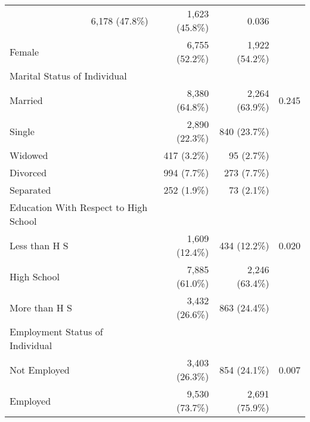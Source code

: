 \begin{tabular}{llll}
  \multicolumn{1}{r}{6,178 (47.8\%)} &
  \multicolumn{1}{r}{1,623 (45.8\%)} &
  \multicolumn{1}{r}{0.036} \\
\multicolumn{1}{l}{\hspace{1em}Female} &
  \multicolumn{1}{r}{6,755 (52.2\%)} &
  \multicolumn{1}{r}{1,922 (54.2\%)} &
  \multicolumn{1}{r}{} \\
\multicolumn{1}{l}{Marital Status of Individual} &
  \multicolumn{1}{r}{} &
  \multicolumn{1}{r}{} &
  \multicolumn{1}{r}{} \\
\multicolumn{1}{l}{\hspace{1em}Married} &
  \multicolumn{1}{r}{8,380 (64.8\%)} &
  \multicolumn{1}{r}{2,264 (63.9\%)} &
  \multicolumn{1}{r}{0.245} \\
\multicolumn{1}{l}{\hspace{1em}Single} &
  \multicolumn{1}{r}{2,890 (22.3\%)} &
  \multicolumn{1}{r}{840 (23.7\%)} &
  \multicolumn{1}{r}{} \\
\multicolumn{1}{l}{\hspace{1em}Widowed} &
  \multicolumn{1}{r}{417 (3.2\%)} &
  \multicolumn{1}{r}{95 (2.7\%)} &
  \multicolumn{1}{r}{} \\
\multicolumn{1}{l}{\hspace{1em}Divorced} &
  \multicolumn{1}{r}{994 (7.7\%)} &
  \multicolumn{1}{r}{273 (7.7\%)} &
  \multicolumn{1}{r}{} \\
\multicolumn{1}{l}{\hspace{1em}Separated} &
  \multicolumn{1}{r}{252 (1.9\%)} &
  \multicolumn{1}{r}{73 (2.1\%)} &
  \multicolumn{1}{r}{} \\
\multicolumn{1}{l}{Education With Respect to High School} &
  \multicolumn{1}{r}{} &
  \multicolumn{1}{r}{} &
  \multicolumn{1}{r}{} \\
\multicolumn{1}{l}{\hspace{1em}Less than H S} &
  \multicolumn{1}{r}{1,609 (12.4\%)} &
  \multicolumn{1}{r}{434 (12.2\%)} &
  \multicolumn{1}{r}{0.020} \\
\multicolumn{1}{l}{\hspace{1em}High School} &
  \multicolumn{1}{r}{7,885 (61.0\%)} &
  \multicolumn{1}{r}{2,246 (63.4\%)} &
  \multicolumn{1}{r}{} \\
\multicolumn{1}{l}{\hspace{1em}More than H S} &
  \multicolumn{1}{r}{3,432 (26.6\%)} &
  \multicolumn{1}{r}{863 (24.4\%)} &
  \multicolumn{1}{r}{} \\
\multicolumn{1}{l}{Employment Status of Individual} &
  \multicolumn{1}{r}{} &
  \multicolumn{1}{r}{} &
  \multicolumn{1}{r}{} \\
\multicolumn{1}{l}{\hspace{1em}Not Employed} &
  \multicolumn{1}{r}{3,403 (26.3\%)} &
  \multicolumn{1}{r}{854 (24.1\%)} &
  \multicolumn{1}{r}{0.007} \\
\multicolumn{1}{l}{\hspace{1em}Employed} &
  \multicolumn{1}{r}{9,530 (73.7\%)} &
  \multicolumn{1}{r}{2,691 (75.9\%)} &
  \multicolumn{1}{r}{} \\
\cmidrule{1-4}
\end{tabular}
